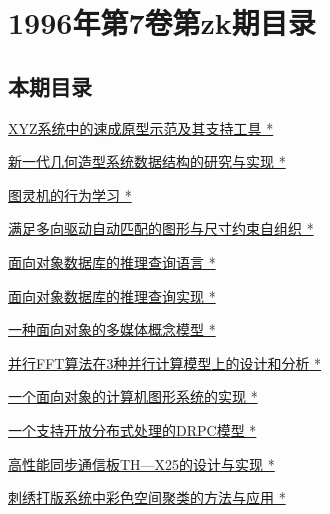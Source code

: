 \documentclass[a4paper]{article}
\begin{document}
\section{\textbf{1996年第7卷第zk期目录}}
\subsection{本期目录}
\href{http://www.jos.org.cn/ch/reader/download_pdf.aspx?file_no=1996s101&year_id=1996&quarter_id=zk&falg=1}{XYZ系统中的速成原型示范及其支持工具 *}

\href{http://www.jos.org.cn/ch/reader/download_pdf.aspx?file_no=1996s102&year_id=1996&quarter_id=zk&falg=1}{新一代几何造型系统数据结构的研究与实现 *}

\href{http://www.jos.org.cn/ch/reader/download_pdf.aspx?file_no=1996s103&year_id=1996&quarter_id=zk&falg=1}{图灵机的行为学习 *}

\href{http://www.jos.org.cn/ch/reader/download_pdf.aspx?file_no=1996s104&year_id=1996&quarter_id=zk&falg=1}{满足多向驱动自动匹配的图形与尺寸约束自组织 *}

\href{http://www.jos.org.cn/ch/reader/download_pdf.aspx?file_no=1996s105&year_id=1996&quarter_id=zk&falg=1}{面向对象数据库的推理查询语言 *}

\href{http://www.jos.org.cn/ch/reader/download_pdf.aspx?file_no=1996s106&year_id=1996&quarter_id=zk&falg=1}{面向对象数据库的推理查询实现 *}

\href{http://www.jos.org.cn/ch/reader/download_pdf.aspx?file_no=1996s107&year_id=1996&quarter_id=zk&falg=1}{一种面向对象的多媒体概念模型 *}

\href{http://www.jos.org.cn/ch/reader/download_pdf.aspx?file_no=1996s108&year_id=1996&quarter_id=zk&falg=1}{并行FFT算法在3种并行计算模型上的设计和分析 *}

\href{http://www.jos.org.cn/ch/reader/download_pdf.aspx?file_no=1996s109&year_id=1996&quarter_id=zk&falg=1}{一个面向对象的计算机图形系统的实现 *}

\href{http://www.jos.org.cn/ch/reader/download_pdf.aspx?file_no=1996s110&year_id=1996&quarter_id=zk&falg=1}{一个支持开放分布式处理的DRPC模型 *}

\href{http://www.jos.org.cn/ch/reader/download_pdf.aspx?file_no=1996s111&year_id=1996&quarter_id=zk&falg=1}{高性能同步通信板TH—X25的设计与实现 *}

\href{http://www.jos.org.cn/ch/reader/download_pdf.aspx?file_no=1996s112&year_id=1996&quarter_id=zk&falg=1}{刺绣打版系统中彩色空间聚类的方法与应用 *}
\end{document}
